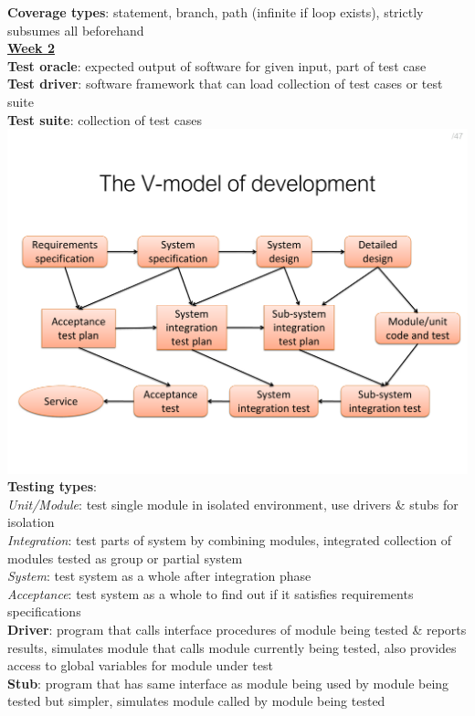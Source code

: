 \documentclass[a4paper]{article}
\begin{document}
\begin{multicols}{3}
        \textbf{Coverage types}: statement, branch, path (infinite if loop exists), strictly subsumes all beforehand\\
        \underline{\textbf{Week 2}}\\
        \textbf{Test oracle}: expected output of software for given input, part of test case\\
        \textbf{Test driver}: software framework that can load collection of test cases or test suite\\
        \textbf{Test suite}: collection of test cases\\
        \includegraphics[width=\linewidth]{96.pdf}\\
        \textbf{Testing types}:\\
        \textit{Unit/Module}: test single module in isolated environment, use drivers \& stubs for isolation\\
        \textit{Integration}: test parts of system by combining modules, integrated collection of modules tested as group or partial system\\
        \textit{System}: test system as a whole after integration phase\\
        \textit{Acceptance}: test system as a whole to find out if it satisfies requirements specifications\\
        \textbf{Driver}: program that calls interface procedures of module being tested \& reports results, simulates module that calls module currently being tested, also provides access to global variables for module under test\\
        \textbf{Stub}: program that has same interface as module being used by module being tested but simpler, simulates module called by module being tested\\

\end{multicols}
\end{document}
